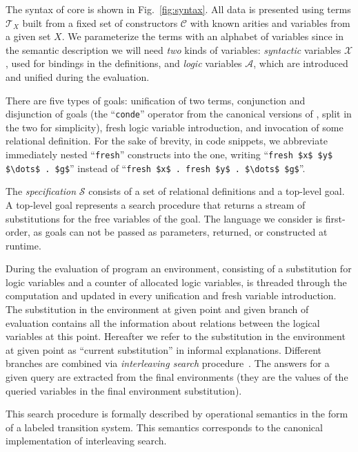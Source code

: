 The syntax of core \mK is shown in Fig.~\ref{fig:syntax}. 
All data is presented using terms $\mathcal{T}_X$ built from a fixed set of constructors $\mathcal{C}$ with known arities and variables
from a given set $X$.
We parameterize the terms with an alphabet of variables since in the semantic description we will need \emph{two} kinds of variables:
\emph{syntactic} variables $\mathcal{X}$, used for bindings in the definitions, and \emph{logic} variables $\mathcal{A}$, which are
introduced and unified during the evaluation.

There are five types of goals: unification of two terms, conjunction and disjunction of goals (the
``\lstinline|conde|'' operator from the canonical versions of \mK, split in the two for simplicity), fresh logic variable introduction, and
invocation of some relational definition. For the sake of brevity, in code snippets, we abbreviate immediately nested ``\lstinline|fresh|''
constructs into the one, writing ``\lstinline|fresh $x$ $y$ $\dots$ . $g$|'' instead of
``\lstinline|fresh $x$ . fresh $y$ . $\dots$ $g$|''.

The \emph{specification} $\mathcal{S}$ consists of a set of relational definitions and a top-level goal.
A top-level goal represents a search procedure that returns a stream of substitutions for the free variables of the goal.
The language we consider is first-order, as goals can not be passed as parameters, returned, or constructed at runtime.

During the evaluation of \mK program an environment, consisting of a substitution for logic variables and a counter of allocated logic
variables, is threaded through the computation and updated in every unification and fresh variable introduction.
The substitution in the environment at given point and given branch of evaluation contains all the information about relations between
the logical variables at this point. Hereafter we refer to the substitution in the environment at given point as ``current substitution''
in informal explanations.
Different branches are combined via \emph{interleaving search} procedure~\cite{InterleavingSearch}.
The answers for a given query are extracted from the final environments (they are the values of the queried variables in the final environment substitution).

This search procedure is formally described by operational semantics in the form of a labeled transition system.
This semantics corresponds to the canonical implementation of interleaving search. 

